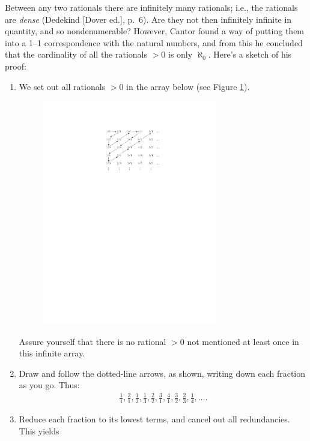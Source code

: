 \documentclass[polutonikogreek,english,twoside,openright]{article}
\begin{document}
\begin{enumerate}
  Between any two rationals there are infinitely many rationals; i.e.,
  the rationals are \emph{dense} (Dedekind [Dover ed.], p.~6). Are
  they not then infinitely infinite in quantity, and so
  nondenumerable? However, Cantor found a way of putting them into a
  1--1 correspondence with the natural numbers, and from this he
  concluded that the cardinality of all the rationals $>0$ is only
  $\aleph_{0}$. Here's a sketch of his proof: \label{rationalarray}
  \begin{enumerate}[(1)]
  \item We set out all rationals $>0$ in the array below (see Figure
    \ref{array}).
    \begin{figure}[htbp] %
      \centering
      \includegraphics[width=3in]{fig/rationalsarray}
      \caption{}
      \label{array}
    \end{figure} Assure yourself that there is no rational $>0$ not
    mentioned at least once in this infinite array.
  \item Draw and follow the dotted-line arrows, as shown, writing down
    each fraction as you go. Thus\label{orderedrationalarray}:
    \begin{align*}
      \tfrac{1}{1},  \tfrac{2}{1},  \tfrac{1}{2}, \tfrac{1}{3},
      \tfrac{2}{2}, \tfrac{3}{1}, \tfrac{4}{1}, \tfrac{3}{2},
      \tfrac{2}{3}, \tfrac{1}{4}, \ldots.
    \end{align*}
  \item Reduce each fraction to its lowest terms, and cancel out all
    redundancies. This yields
    \begin{align*}

\end{align*}
\end{enumerate}
\end{enumerate}
\end{document}
